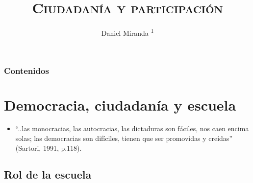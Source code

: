 \documentclass[]{beamer} %
\title[Sociología de la Educación 2016 - SOL 141] %
{\textsc{\large{Ciudadanía y participación}}}
\author[Daniel Miranda] %
{{{\small Daniel Miranda \textsuperscript{1}}}}
\institute{\textsuperscript{1}
	Pontificia Universidad Católica de Chile \\
	Facultad de Ciencias Sociales \\ 
	Instituto de Sociología \\  
	
	}
\date {\begin{tiny}
		{Septiembre 21, 2016} %
	\end{tiny}}
\begin{document}

\begin{frame}[plain,label=firstframe] %
  \titlepage
\end{frame}



\begin{frame}
	\frametitle{Contenidos}
	\tableofcontents
\end{frame}

\section{Democracia, ciudadanía y escuela} 

\begin{frame} [allowframebreaks]
	\begin{itemize}
		\item  “..las monocracias, las autocracias, las dictaduras son fáciles, nos caen encima solas; las democracias son difíciles, tienen que ser promovidas y creídas” (Sartori, 1991, p.118).
	\end{itemize}
\end{frame}
	
	
\subsection{Rol de la escuela}
	
\end{document}
